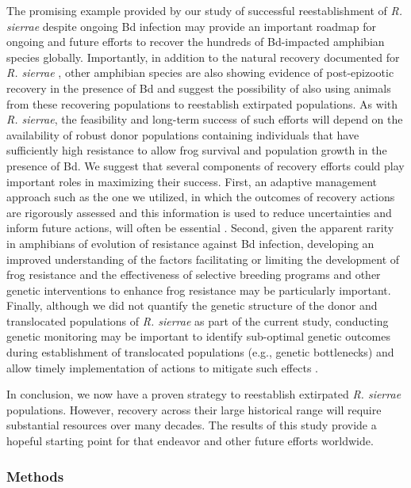 \documentclass[
  letterpaper,
  DIV=11,
  numbers=noendperiod]{scrartcl}
\begin{document}
The promising example provided by our study of successful
reestablishment of \emph{R. sierrae} despite ongoing Bd infection may
provide an important roadmap for ongoing and future efforts to recover
the hundreds of Bd-impacted amphibian species globally. Importantly, in
addition to the natural recovery documented for \emph{R. sierrae}
\citep{knapp2016}, other amphibian species are also showing evidence of
post-epizootic recovery in the presence of Bd
\citep{scheele2017, voyles2018} and suggest the possibility of also
using animals from these recovering populations to reestablish
extirpated populations. As with \emph{R. sierrae}, the feasibility and
long-term success of such efforts will depend on the availability of
robust donor populations containing individuals that have sufficiently
high resistance to allow frog survival and population growth in the
presence of Bd. We suggest that several components of recovery efforts
could play important roles in maximizing their success. First, an
adaptive management approach such as the one we utilized, in which the
outcomes of recovery actions are rigorously assessed and this
information is used to reduce uncertainties and inform future actions,
will often be essential \citep{canessa2019}. Second, given the apparent
rarity in amphibians of evolution of resistance against Bd infection,
developing an improved understanding of the factors facilitating or
limiting the development of frog resistance and the effectiveness of
selective breeding programs and other genetic interventions to enhance
frog resistance \citep{kosch2022} may be particularly important.
Finally, although we did not quantify the genetic structure of the donor
and translocated populations of \emph{R. sierrae} as part of the current
study, conducting genetic monitoring may be important to identify
sub-optimal genetic outcomes during establishment of translocated
populations (e.g., genetic bottlenecks) and allow timely implementation
of actions to mitigate such effects \citep{whiteley2015}.

In conclusion, we now have a proven strategy to reestablish extirpated
\emph{R. sierrae} populations. However, recovery across their large
historical range will require substantial resources over many decades.
The results of this study provide a hopeful starting point for that
endeavor and other future efforts worldwide.

\subsubsection{Methods}\label{methods}
\end{document}
